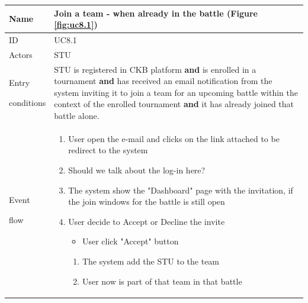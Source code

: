 \begin{center}
    \def\arraystretch{1.5}
    \begin{tabular}{| m{2cm} | m{10cm}|}
        \hline
        Name                  & Join a team - when already in the battle (Figure \ref{fig:uc8.1}) \\ \hline
        ID                    & UC8.1                                   \\ \hline
        Actors                & STU                                   \\ \hline
        Entry \par conditions & STU is registered in CKB platform 
                                    \textbf{and} is enrolled in a tournament 
                                    \textbf{and} has received an email notification from the system inviting it to join a team for an upcoming battle within the context of the enrolled tournament 
                                    \textbf{and} it has already joined that battle alone.                                    \\ \hline
        Event \par flow       & \begin{enumerate}
                                    \item User open the e-mail and clicks on the link attached to be redirect to the system
                                    \item {\color{red} Should we talk about the log-in here?}
                                    \item The system show the "Dashboard" page with the invitation, if the join windows for the battle is still open
                                    \item User decide to Accept or Decline the invite 
                                        \begin{itemize}
                                            \item User click "Accept" button
                                        \end{itemize} 
                                            \begin{enumerate}
                                                \item The system add the STU to the team
                                                \item User now is part of that team in that battle
                                            \end{enumerate}

\end{enumerate}
\end{tabular}
\end{center}
